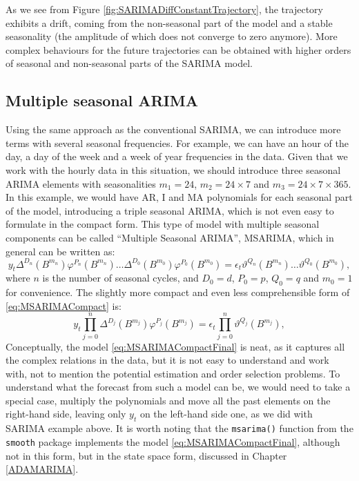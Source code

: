 \documentclass[
]{book}
\theoremstyle{definition}
\theoremstyle{definition}
\theoremstyle{definition}
\theoremstyle{definition}
\theoremstyle{remark}
\begin{document}
As we see from Figure \ref{fig:SARIMADiffConstantTrajectory}, the trajectory exhibits a drift, coming from the non-seasonal part of the model and a stable seasonality (the amplitude of which does not converge to zero anymore). More complex behaviours for the future trajectories can be obtained with higher orders of seasonal and non-seasonal parts of the SARIMA model.

\hypertarget{MSARIMA}{%
\subsection{Multiple seasonal ARIMA}\label{MSARIMA}}

Using the same approach as the conventional SARIMA, we can introduce more terms \citep[similar to how][ did it]{Taylor2003a} with several seasonal frequencies. For example, we can have an hour of the day, a day of the week and a week of year frequencies in the data. Given that we work with the hourly data in this situation, we should introduce three seasonal ARIMA elements with seasonalities \(m_1=24\), \(m_2=24 \times 7\) and \(m_3=24 \times 7 \times 365\). In this example, we would have AR, I and MA polynomials for each seasonal part of the model, introducing a triple seasonal ARIMA, which is not even easy to formulate in the compact form. This type of model with multiple seasonal components can be called ``Multiple Seasonal ARIMA'', MSARIMA, which in general can be written as:
\begin{equation}
  y_t \Delta^{D_n}(B^{m_n}) \varphi^{P_n}(B^{m_n}) \dots \Delta^{D_0}(B^{m_0}) \varphi^{P_0}(B^{m_0}) = \epsilon_t \vartheta^{Q_n}(B^{m_n}) \dots \vartheta^{Q_0}(B^{m_0}) ,
  \label{eq:MSARIMACompact}
\end{equation}
where \(n\) is the number of seasonal cycles, and \(D_0=d\), \(P_0=p\), \(Q_0=q\) and \(m_0=1\) for convenience. The slightly more compact and even less comprehensible form of \eqref{eq:MSARIMACompact} is:
\begin{equation}
  y_t \prod_{j=0}^n \Delta^{D_j} (B^{m_j}) \varphi^{P_j}(B^{m_j}) = \epsilon_t \prod_{j=0}^n \vartheta^{Q_j}(B^{m_j}) ,
  \label{eq:MSARIMACompactFinal}
\end{equation}
Conceptually, the model \eqref{eq:MSARIMACompactFinal} is neat, as it captures all the complex relations in the data, but it is not easy to understand and work with, not to mention the potential estimation and order selection problems. To understand what the forecast from such a model can be, we would need to take a special case, multiply the polynomials and move all the past elements on the right-hand side, leaving only \(y_t\) on the left-hand side one, as we did with SARIMA example above. It is worth noting that the \texttt{msarima()} function from the \texttt{smooth} package implements the model \eqref{eq:MSARIMACompactFinal}, although not in this form, but in the state space form, discussed in Chapter \ref{ADAMARIMA}.
\end{document}
